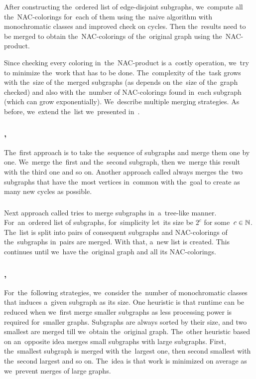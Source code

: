 After constructing the~ordered list of edge-disjoint subgraphs,
we~compute all the~NAC-colorings for~each of them using
the~naive algorithm with monochromatic classes
and improved check on cycles.
Then the~results need to be merged to obtain the~NAC-colorings of the~original graph
using the~NAC-product.

Since checking every coloring in~the~NAC-product is a~costly operation,
we~try to minimize the~work that has to be done.
The~complexity of the~task grows with the~size of
the~merged subgraphs (as \IsNACColoring{} depends on the~size of the~graph checked)
and also with the~number of NAC-colorings found in~each subgraph
(which can grow exponentially).
We~describe multiple merging strategies.
As before, we~extend the~list we~presented in~\cite{my_paper}.

\subsubsection*{\MergeLinear{}, \SharedVertices{}}

The~first approach \MergeLinear{} is
to take the~sequence of subgraphs and merge them one by one.
We~merge the~first and the~second subgraph, then we~merge this result with the
third one and so on.
%
Another approach called \SharedVertices{} always merges the~two subgraphs that
have the~most vertices in~common with the~goal
to create as many new cycles as possible.

\subsubsection*{\Log{}}

Next approach called \Log{} tries to merge subgraphs in~a~tree-like manner.
For~an~ordered list of subgraphs,
for~simplicity let~its size be \( 2^c \) for some~\( c \in \mathbb{N} \).
The~list is split into pairs of consequent subgraphs and NAC-colorings
of the~subgraphs in~pairs are merged. With that, a~new list is created.
This continues until we~have the~original graph and all its NAC-colorings.

\subsubsection*{\SortedBits{}, \MinMax{}}

For~the~following strategies,
we~consider the~number of monochromatic classes
that induces a~given subgraph as its size.
%
One heuristic \SortedBits{} is that runtime can be reduced
when we~first merge smaller subgraphs as less processing power is
required for~smaller graphs.
Subgraphs are always sorted by their size, and two smallest are merged
till we~obtain the~original graph.
%
The~other heuristic \MinMax{} based on an~opposite idea
merges small subgraphs with large subgraphs.
First, the~smallest subgraph is merged with the~largest one,
then second smallest with the~second largest and so on.
The~idea is that work is minimized on average
as we~prevent merges of large graphs.

